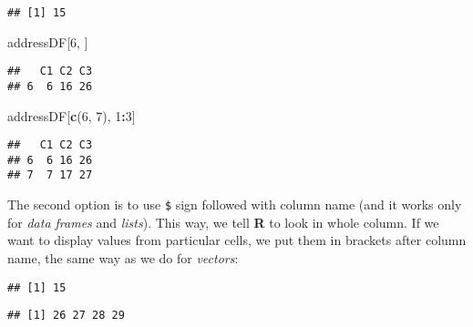 \documentclass[]{book}
\newenvironment{Shaded}{\begin{snugshade}}{\end{snugshade}}
\newcommand{\KeywordTok}[1]{\textcolor[rgb]{0.13,0.29,0.53}{\textbf{#1}}}
\newcommand{\DecValTok}[1]{\textcolor[rgb]{0.00,0.00,0.81}{#1}}
\newcommand{\OperatorTok}[1]{\textcolor[rgb]{0.81,0.36,0.00}{\textbf{#1}}}
\newcommand{\NormalTok}[1]{#1}
\theoremstyle{definition}
\theoremstyle{definition}
\theoremstyle{definition}
\theoremstyle{remark}
\begin{document}
\begin{verbatim}
## [1] 15
\end{verbatim}

\begin{Shaded}
\begin{Highlighting}[]
\NormalTok{addressDF[}\DecValTok{6}\NormalTok{, ]}
\end{Highlighting}
\end{Shaded}

\begin{verbatim}
##   C1 C2 C3
## 6  6 16 26
\end{verbatim}

\begin{Shaded}
\begin{Highlighting}[]
\NormalTok{addressDF[}\KeywordTok{c}\NormalTok{(}\DecValTok{6}\NormalTok{, }\DecValTok{7}\NormalTok{), }\DecValTok{1}\OperatorTok{:}\DecValTok{3}\NormalTok{]}
\end{Highlighting}
\end{Shaded}

\begin{verbatim}
##   C1 C2 C3
## 6  6 16 26
## 7  7 17 27
\end{verbatim}

The second option is to use \texttt{\$} sign followed with column name
(and it works only for \emph{data frames} and \emph{lists}). This way,
we tell \textbf{R} to look in whole column. If we want to display values
from particular cells, we put them in brackets after column name, the
same way as we do for \emph{vectors}:

\begin{Shaded}
\end{Shaded}

\begin{verbatim}
## [1] 15
\end{verbatim}

\begin{Shaded}
\end{Shaded}

\begin{verbatim}
## [1] 26 27 28 29
\end{verbatim}
\end{document}
